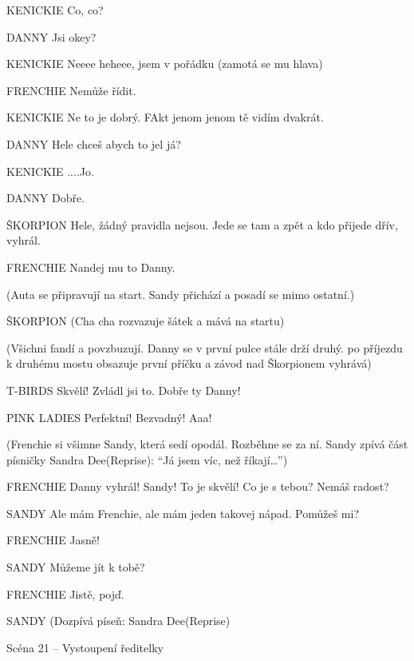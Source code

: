 KENICKIE         Co, co? 

DANNY        Jsi okey? 

KENICKIE        Neeee heheee, jsem v pořádku (zamotá se mu hlava) 

FRENCHIE        Nemůže řídit. 

KENICKIE         Ne to je dobrý. FAkt jenom jenom tě vidím dvakrát. 

DANNY        Hele chceš abych to jel já? 

KENICKIE        ....Jo.

DANNY        Dobře. 

ŠKORPION        Hele, žádný pravidla nejsou. Jede se tam a zpět a kdo přijede dřív,         vyhrál. 

FRENCHIE        Nandej mu to Danny. 

(Auta se připravují na start. Sandy přichází a posadí se mimo ostatní.)

ŠKORPION         (Cha cha rozvazuje šátek a mává na startu)

                (Všichni fandí a povzbuzují. Danny se v první pulce stále drží druhý.                po příjezdu k druhému mostu obsazuje první příčku a závod nad                 Škorpionem vyhrává)

T-BIRDS        Skvělí! Zvládl jsi to. Dobře ty Danny!

PINK LADIES        Perfektní! Bezvadný! Aaa!





(Frenchie si všimne Sandy, která sedí opodál. Rozběhne se za ní. Sandy zpívá část písničky Sandra Dee(Reprise): “Já jsem víc, než říkají…”)





FRENCHIE        Danny vyhrál! Sandy! To je skvělí! Co je s tebou? Nemáš radost?

SANDY        Ale mám Frenchie, ale mám jeden takovej nápad. Pomůžeš mi? 

FRENCHIE        Jasně! 

SANDY        Můžeme jít k tobě? 

FRENCHIE        Jistě, pojď. 

SANDY        (Dozpívá píseň: Sandra Dee(Reprise)









Scéna 21  – Vystoupení ředitelky 

